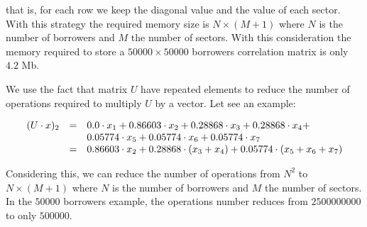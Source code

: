 \documentclass[a4paper,12pt,final]{article}
\begin{document}
that is, for each row we keep the diagonal value and the value of each sector. 
With this strategy the required memory size is $N \times (M+1)$ where $N$ is
the number of borrowers and $M$ the number of sectors. With this consideration
the memory required to store a $50000 \times 50000$ borrowers correlation matrix
is only $4.2$ Mb.
\newline

We use the fact that matrix $U$ have repeated elements to reduce the number of 
operations required to multiply $U$ by a vector. Let see an example:

\begin{displaymath}
\begin{array}{rcl}
(U \cdot x)_2 & = & 0.0 \cdot x_1 + 0.86603 \cdot x_2 + 0.28868 \cdot x_3 + 0.28868 \cdot x_4 + \cr
              &   & 0.05774 \cdot x_5 + 0.05774 \cdot x_6 + 0.05774 \cdot x_7 \cr
              & = & 0.86603 \cdot x_2 + 0.28868 \cdot (x_3 + x_4) + 0.05774 \cdot (x_5 + x_6 + x_7)
\end{array}
\end{displaymath}

Considering this, we can reduce the number of operations from $N^2$ to 
$N \times (M+1)$ where $N$ is the number of borrowers and $M$ the number of 
sectors. In the $50000$ borrowers example, the operations number reduces from 
$2500000000$ to only $500000$.


\newpage


\end{document}
